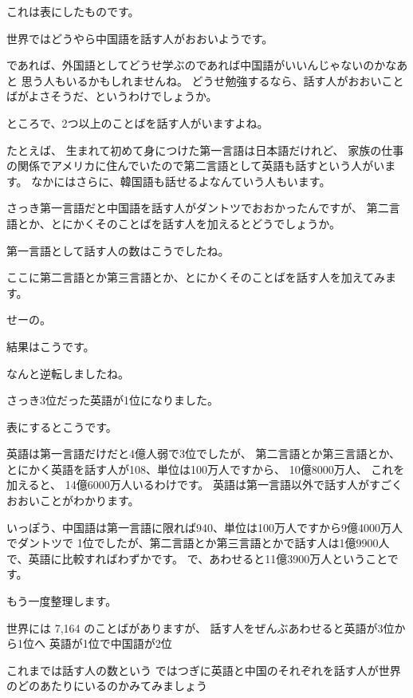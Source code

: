 \documentclass[12pt]{jlreq}
\begin{document}
\hrulefill

これは表にしたものです。

世界ではどうやら中国語を話す人がおおいようです。

であれば、外国語としてどうせ学ぶのであれば中国語がいいんじゃないのかなあと
思う人もいるかもしれませんね。
どうせ勉強するなら、話す人がおおいことばがよさそうだ、というわけでしょうか。


\hrulefill

ところで、2つ以上のことばを話す人がいますよね。

たとえば、
生まれて初めて身につけた第一言語は日本語だけれど、
家族の仕事の関係でアメリカに住んでいたので第二言語として英語も話すという人がいます。
なかにはさらに、韓国語も話せるよなんていう人もいます。

\hrulefill

さっき第一言語だと中国語を話す人がダントツでおおかったんですが、
第二言語とか、とにかくそのことばを話す人を加えるとどうでしょうか。

\hrulefill

第一言語として話す人の数はこうでしたね。

ここに第二言語とか第三言語とか、とにかくそのことばを話す人を加えてみます。

せーの。


\hrulefill

結果はこうです。

なんと逆転しましたね。

さっき3位だった英語が1位になりました。

\hrulefill

表にするとこうです。

英語は第一言語だけだと4億人弱で3位でしたが、
第二言語とか第三言語とか、とにかく英語を話す人が108、単位は100万人ですから、
10億8000万人、
これを加えると、
14億6000万人いるわけです。
英語は第一言語以外で話す人がすごくおおいことがわかります。

いっぽう、中国語は第一言語に限れば940、単位は100万人ですから9億4000万人でダントツで
1位でしたが、第二言語とか第三言語とかで話す人は1億9900人で、英語に比較すればわずかです。
で、あわせると11億3900万人ということです。

\hrulefill

もう一度整理します。

世界には 7,164 のことばがありますが、
話す人をぜんぶあわせると英語が3位から1位へ
英語が1位で中国語が2位

\hrulefill

これまでは話す人の数という
ではつぎに英語と中国のそれぞれを話す人が世界のどのあたりにいるのかみてみましょう
\end{document}
